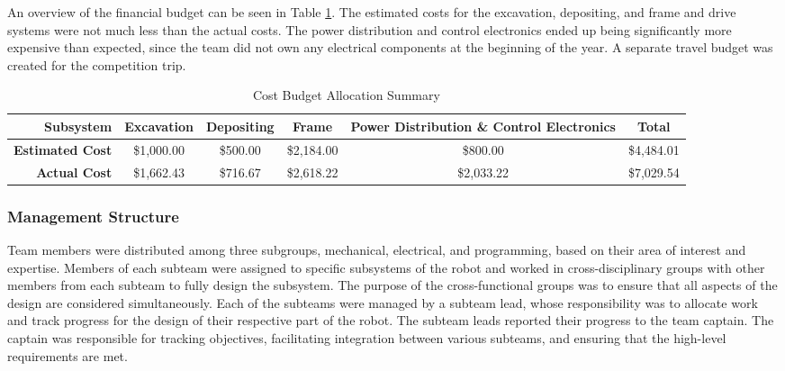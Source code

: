 \documentclass[class=article, crop=false]{standalone}
\begin{document}
	An overview of the financial budget can be seen in Table \ref{table:cost_budget}. The estimated costs for the excavation, depositing, and frame and drive systems were not much less than the actual costs. The power distribution and control electronics ended up being significantly more expensive than expected, since the team did not own any electrical components at the beginning of the year. A separate travel budget was created for the competition trip. 
	
	\FloatBarrier
	\begin{table}[h]
	\scriptsize
	\centering
	\begin{tabular}{ | r | c | c | c | c | c | }
 	\hline		
 	\rowcolor[gray]{0.8}
 		\textbf{Subsystem} & \textbf{Excavation} & \textbf{Depositing} & \textbf{Frame} & \textbf{Power Distribution \& Control Electronics} & \textbf{Total} \\
 		\hline\hline
 		\textbf{Estimated Cost} & \$1,000.00 & \$500.00 & \$2,184.00 & \$800.00 &  \$4,484.01 \\
	\hline
		\textbf{Actual Cost} & \$1,662.43 & \$716.67 & \$2,618.22 & \$2,033.22 & \$7,029.54 \\
	\hline
	\end{tabular}
	\caption{Cost Budget Allocation Summary}
		\label{table:cost_budget}
	\end{table}
	\FloatBarrier
	
	\subsubsection{Management Structure}
	Team members were distributed among three subgroups, mechanical, electrical, and programming, based on their area of interest and expertise. Members of each subteam were assigned to specific subsystems of the robot and worked in cross-disciplinary groups with other members from each subteam to fully design the subsystem. The purpose of the cross-functional groups was to ensure that all aspects of the design are considered simultaneously. Each of the subteams were managed by a subteam lead, whose responsibility was to allocate work and track progress for the design of their respective part of the robot. The subteam leads reported their progress to the team captain. The captain was responsible for tracking objectives, facilitating integration between various subteams, and ensuring that the high-level requirements are met.
\end{document}
